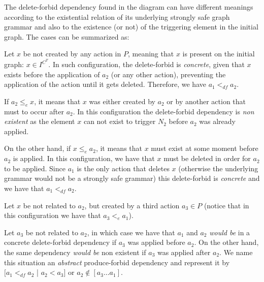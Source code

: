 The delete-forbid dependency found in the diagram can have different meanings  according to the existential relation of its underlying strongly safe graph grammar and also to the existence (or not) of the triggering element in the initial graph. The cases can be summarized as:


\begin{description}[style=nextline,leftmargin=*]

  \item [Triggering element is present on the initial graph:]
Let $x$ be not created by any action in $P$, meaning that $x$ is present on the initial graph: $x \in I^{C^T}$. In such configuration, the delete-forbid is \emph{concrete}, given that $x$ exists before the application of $a_2$ (or any other action), preventing the application of the action until it gets deleted. Therefore, we have $a_1 <_{df} a_2$.

  \item [Triggering element is related to the action:] If $a_2 \leq_e x$, it means that $x$ was either created by $a_2$ or by another action that must to occur after $a_2$. In this configuration the delete-forbid dependency is \emph{non existent} as the element $x$ can not exist to trigger $N_2$ before $a_2$ was already applied.

    On the other hand, if $x \leq_e a_2$, it means that $x$ must exist at some moment before $a_2$ is applied. In this configuration, we have that $x$ must be deleted in order for $a_2$ to be applied. Since $a_1$ is the only action that deletes $x$ (otherwise the underlying grammar would not be a strongly safe grammar) this delete-forbid is \emph{concrete} and we have that $a_1 <_{df} a_2$.

\item [Triggering element is not related to the action:]
  Let $x$ be not related to $a_2$, but created by a third action $a_3 \in P$ (notice that in this configuration we have that $a_3 <_{e} a_1$).

    Let $a_3$ be not related to $a_2$, in which case we have that $a_1$ and $a_2$ \emph{would be} in a concrete delete-forbid dependency if $a_3$ was applied before $a_2$. On the other hand, the same dependency \emph{would be} non existent if $a_3$ was applied after $a_2$. We name this situation an \emph{abstract} produce-forbid dependency and represent it by $[a_1 <_{df} a_2$ | $a_2 < a_3]$ or $a_2 \not\in [a_3 \ldots a_1]$.


\end{description}
